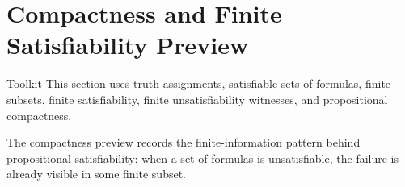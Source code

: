 \section{Compactness and Finite Satisfiability Preview}

\begin{toolkitbox}{Toolkit}
This section uses truth assignments, satisfiable sets of formulas, finite
subsets, finite satisfiability, finite unsatisfiability witnesses, and
propositional compactness.
\end{toolkitbox}

\begin{remark*}[Exposition]
The compactness preview records the finite-information pattern behind
propositional satisfiability: when a set of formulas is unsatisfiable, the
failure is already visible in some finite subset.
\end{remark*}

\label{sec:propositional-compactness-preview}








